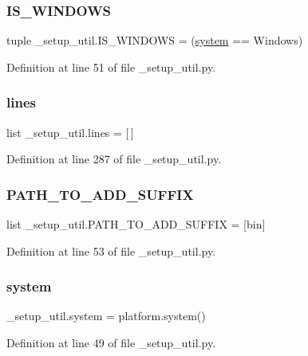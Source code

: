 \subsubsection{\texorpdfstring{I\+S\+\_\+\+W\+I\+N\+D\+O\+WS}{IS\_WINDOWS}}
{\footnotesize\ttfamily tuple \+\_\+setup\+\_\+util.\+I\+S\+\_\+\+W\+I\+N\+D\+O\+WS = (\hyperlink{namespace__setup__util_ae9fca6a80a6923f4580be72f68fee325}{system} == \textquotesingle{}Windows\textquotesingle{})}



Definition at line 51 of file \+\_\+setup\+\_\+util.\+py.

\mbox{\label{namespace__setup__util_a8618d8be5f729d4c9696daa5e083a001}} 
\subsubsection{\texorpdfstring{lines}{lines}}
{\footnotesize\ttfamily list \+\_\+setup\+\_\+util.\+lines = \mbox{[}$\,$\mbox{]}}



Definition at line 287 of file \+\_\+setup\+\_\+util.\+py.

\mbox{\label{namespace__setup__util_a7de27b8c021c888c6288a885f1e9afa9}} 
\subsubsection{\texorpdfstring{P\+A\+T\+H\+\_\+\+T\+O\+\_\+\+A\+D\+D\+\_\+\+S\+U\+F\+F\+IX}{PATH\_TO\_ADD\_SUFFIX}}
{\footnotesize\ttfamily list \+\_\+setup\+\_\+util.\+P\+A\+T\+H\+\_\+\+T\+O\+\_\+\+A\+D\+D\+\_\+\+S\+U\+F\+F\+IX = \mbox{[}\textquotesingle{}bin\textquotesingle{}\mbox{]}}



Definition at line 53 of file \+\_\+setup\+\_\+util.\+py.

\mbox{\label{namespace__setup__util_ae9fca6a80a6923f4580be72f68fee325}} 
\subsubsection{\texorpdfstring{system}{system}}
{\footnotesize\ttfamily \+\_\+setup\+\_\+util.\+system = platform.\+system()}



Definition at line 49 of file \+\_\+setup\+\_\+util.\+py.


